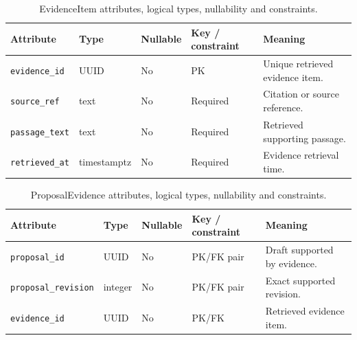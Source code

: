 \begin{table}[htbp]
\setlength{\tabcolsep}{5pt}
\centering
\small
\caption{EvidenceItem attributes, logical types, nullability and constraints.}
\label{tab:kashaf:dict-evidenceitem}
\begin{tabular}{|p{}|p{}|p{}|p{}|p{}|}
\hline
Attribute & Type & Nullable & Key / constraint & Meaning \\ \hline
\texttt{evidence\_id} & UUID & No & PK & Unique retrieved evidence item. \\ \hline
\texttt{source\_ref} & text & No & Required & Citation or source reference. \\ \hline
\texttt{passage\_text} & text & No & Required & Retrieved supporting passage. \\ \hline
\texttt{retrieved\_at} & timestamptz & No & Required & Evidence retrieval time. \\ \hline
\end{tabular}
\end{table}

\begin{table}[htbp]
\setlength{\tabcolsep}{5pt}
\centering
\small
\caption{ProposalEvidence attributes, logical types, nullability and constraints.}
\label{tab:kashaf:dict-proposalevidence}
\begin{tabular}{|p{}|p{}|p{}|p{}|p{}|}
\hline
Attribute & Type & Nullable & Key / constraint & Meaning \\ \hline
\texttt{proposal\_id} & UUID & No & PK/FK pair & Draft supported by evidence. \\ \hline
\texttt{proposal\_revision} & integer & No & PK/FK pair & Exact supported revision. \\ \hline
\texttt{evidence\_id} & UUID & No & PK/FK & Retrieved evidence item. \\ \hline
\end{tabular}
\end{table}

